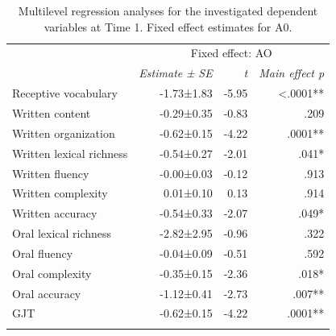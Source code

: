 \documentclass[output=paper,modfonts,nonflat,newtxmath]{langsci/langscibook}
\begin{document}
\begin{table}
\caption{\label{tab:pfenninger:4} Multilevel regression analyses for the investigated dependent variables at Time 1. Fixed effect estimates for A0.}
\begin{tabularx}{0.85\textwidth}{lrrr}
\lsptoprule
& \multicolumn{3}{c}{ Fixed effect: AO}\\
\cmidrule{2-4}
 & \textit{Estimate} \textit{±} \textit{SE} & \textit{t}  & \textit{Main effect p}\\
\cmidrule{1-4}
Receptive vocabulary & -1.73±1.83 & -5.95 & <.0001**\\
Written content & -0.29±0.35 & -0.83 & .209 \\
Written organization & -0.62±0.15 & -4.22 & .0001** \\
Written lexical richness & -0.54±0.27 & -2.01 & .041*\\
Written fluency & -0.00±0.03 & -0.12 & .913\\
Written complexity & 0.01±0.10 & 0.13 & .914\\
Written accuracy & -0.54±0.33 & -2.07 & .049*\\
Oral lexical richness & -2.82±2.95 & -0.96 & .322\\
Oral fluency & -0.04±0.09 & -0.51 & .592\\
Oral complexity & -0.35±0.15 & -2.36 & .018*\\
Oral accuracy & -1.12±0.41 & -2.73 & .007**\\
GJT & -0.62±0.15 & -4.22 & .0001**\\
\lspbottomrule
\end{tabularx}

\end{table}
\end{document}
